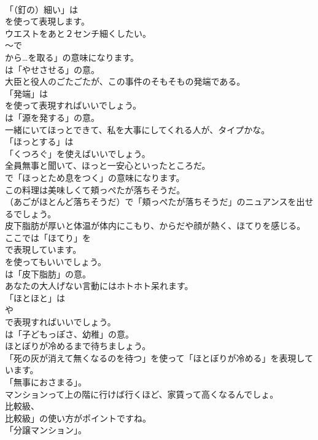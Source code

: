\documentclass[8pt]{extreport}
\begin{document}
\begin{CJK}{UTF8}{min}
\\	「（釘の）細い」は
\\	を使って表現します。	
\\	ウエストをあと２センチ細くしたい。 
\\	～で
\\	から…を取る」の意味になります。
\\	は「やせさせる」の意。	
\\	大臣と役人のごたごたが、この事件のそもそもの発端である。 
\\	「発端」は 
\\	を使って表現すればいいでしょう。
\\	は「源を発する」の意。	
\\	一緒にいてほっとできて、私を大事にしてくれる人が、タイプかな。 
\\	「ほっとする」は
\\	「くつろぐ」を使えばいいでしょう。	
\\	全員無事と聞いて、ほっと一安心といったところだ。 
\\	で「ほっとため息をつく」の意味になります。	
\\	この料理は美味しくて頬っぺたが落ちそうだ。 
\\	（あごがほとんど落ちそうだ）で「頬っぺたが落ちそうだ」のニュアンスを出せるでしょう。	
\\	皮下脂肪が厚いと体温が体内にこもり、からだや顔が熱く、ほてりを感じる。 
\\	ここでは「ほてり」を 
\\	で表現しています。
\\	を使ってもいいでしょう。
\\	は「皮下脂肪」の意。	
\\	あなたの大人げない言動にはホトホト呆れます。 
\\	「ほとほと」は 
\\	や 
\\	で表現すればいいでしょう。
\\	は「子どもっぽさ、幼稚」の意。	
\\	ほとぼりが冷めるまで待ちましょう。 
\\	「死の灰が消えて無くなるのを待つ」を使って「ほとぼりが冷める」を表現しています。
\\	「無事におさまる」。	
\\	マンションって上の階に行けば行くほど、家賃って高くなるんでしょ。 
\\	比較級、
\\	比較級」の使い方がポイントですね。
\\	「分譲マンション」。	

\end{CJK}
\end{document}
